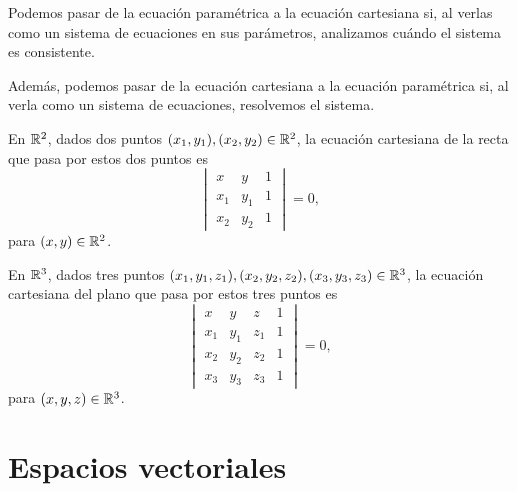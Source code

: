 \documentclass[a4,11pt]{aleph-notas}
\begin{document}
\begin{advertencia}
    Podemos pasar de la ecuación paramétrica a la ecuación cartesiana si, al verlas como un sistema de ecuaciones en sus parámetros, analizamos cuándo el sistema es consistente.
    
    Además, podemos pasar de la ecuación cartesiana a la ecuación paramétrica si, al verla como un sistema de ecuaciones, resolvemos el sistema.
\end{advertencia}

\begin{advertencia}
    En $\mathbb{R}^2$, dados dos puntos $(x_1,y_1),(x_2,y_2)\in\mathbb{R}^2$, la ecuación cartesiana de la recta que pasa por estos dos puntos es
    \[
        \begin{vmatrix}
            x & y & 1\\
            x_1 & y_1 & 1\\
            x_2 & y_2 & 1
        \end{vmatrix}
        = 0,
    \]
    para $(x,y)\in\mathbb{R}^2$.
\end{advertencia}

\begin{advertencia}
    En $\mathbb{R}^3$, dados tres puntos $(x_1,y_1,z_1),(x_2,y_2,z_2),(x_3,y_3,z_3)\in\mathbb{R}^3$, la ecuación cartesiana del plano que pasa por estos tres puntos es
    \[
        \begin{vmatrix}
            x & y & z & 1\\
            x_1 & y_1 & z_1 & 1\\
            x_2 & y_2 & z_2 & 1\\
            x_3 & y_3 & z_3 & 1
        \end{vmatrix}
        = 0,
    \]
    para $(x,y,z)\in\mathbb{R}^3$.
\end{advertencia}

\section{Espacios vectoriales}
\end{document}
